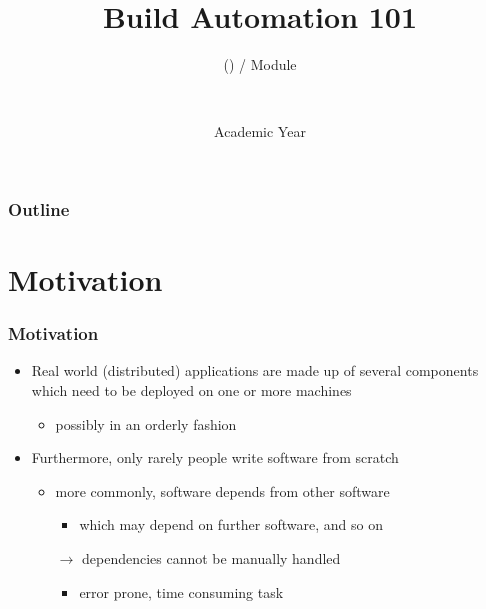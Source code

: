 \documentclass[presentation]{beamer}\mode<presentation>{\usetheme{AMSBolognaFC}}
\title[\currentLab{} -- Build Automation]{
	Build Automation 101
}
\subtitle{\courseName{} (\courseAcronym) / Module \moduleN{}}
\author[\sspeaker{\gcShort} \& \mmShort]{
	\speaker{\gcFull} \and \mmFull
	\\
	\gcEmail \and \mmEmail
}
\institute[\disiShort, \uniboShort]{\disi{} (\disiShort)\\\unibo}
\date[A.Y. \academicYear{}]{Academic Year \academicYear{}}
\begin{document}
\maketitle

\begin{frame}[c]\frametitle{Outline}
	    \tableofcontents[sectionstyle=show/show, subsectionstyle=show/show, subsubsectionstyle=show/show]
\end{frame}

\section{Motivation}

\begin{frame}[allowframebreaks]
\frametitle{Motivation}

    \begin{itemize}
        \item Real world (distributed) applications are made up of several \alert{components} which need to be \alert{deployed} on one or more machines
        \begin{itemize}
            \item possibly in an orderly fashion
        \end{itemize}

        \bigskip

        \item Furthermore, only rarely people write software \alert{from scratch}
        \begin{itemize}
            \item more commonly, software \alert{depends} from other software
            \begin{itemize}
                \item which may depend on further software, and so on
            \end{itemize}

            \item[$\rightarrow$] dependencies cannot be \alert{manually} handled
            \begin{itemize}
                \item error prone, time consuming task
            \end{itemize}
        \end{itemize}


\end{itemize}
\end{frame}
\end{document}
